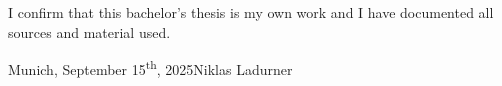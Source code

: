 
\vspace*{\fill}

\noindent I confirm that this bachelor's thesis is my own work and I have documented all sources and material used.

\vspace*{\fill}

\noindent Munich, September 15\textsuperscript{th}, 2025\hfill Niklas Ladurner

\MediaOptionLogic